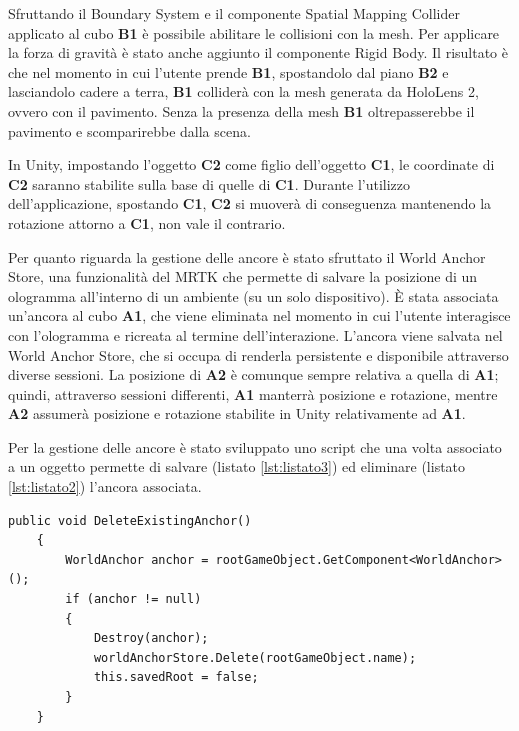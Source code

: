 Sfruttando il Boundary System e il componente Spatial Mapping Collider applicato al cubo \textbf{B1} è possibile abilitare le collisioni con la mesh. Per applicare la forza di gravità è stato anche aggiunto il componente Rigid Body.
Il risultato è che nel momento in cui l'utente prende \textbf{B1}, spostandolo dal piano \textbf{B2} e lasciandolo cadere a terra, \textbf{B1} colliderà con la mesh generata da HoloLens 2, ovvero con il pavimento.
Senza la presenza della mesh \textbf{B1} oltrepasserebbe il pavimento e scomparirebbe dalla scena.

In Unity, impostando l'oggetto \textbf{C2} come figlio dell'oggetto \textbf{C1}, le coordinate di \textbf{C2} saranno stabilite sulla base di quelle di \textbf{C1}. Durante l'utilizzo dell'applicazione, spostando \textbf{C1}, \textbf{C2} si muoverà di conseguenza mantenendo la rotazione attorno a \textbf{C1}, non vale il contrario.

Per quanto riguarda la gestione delle ancore è stato sfruttato il World Anchor Store, una funzionalità del MRTK che permette di salvare la posizione di un ologramma all'interno di un ambiente (su un solo dispositivo).
È stata associata un'ancora al cubo \textbf{A1}, che viene eliminata nel momento in cui l'utente interagisce con l'ologramma e ricreata al termine dell'interazione.
L'ancora viene salvata nel World Anchor Store, che si occupa di renderla persistente e disponibile attraverso diverse sessioni.
La posizione di \textbf{A2} è comunque sempre relativa a quella di \textbf{A1}; quindi, attraverso sessioni differenti, \textbf{A1} manterrà posizione e rotazione, mentre \textbf{A2} assumerà posizione e rotazione stabilite in Unity relativamente ad \textbf{A1}. 

Per la gestione delle ancore è stato sviluppato uno script che una volta associato a un oggetto permette di salvare (listato \ref{lst:listato3}) ed eliminare (listato \ref{lst:listato2}) l'ancora associata.

\lstset{language=[Sharp]C, numbers=left}
\begin{lstlisting}[caption={Metodo richiamato per eliminare l'ancora dell'ologramma associato.}, label=lst:listato2]
    public void DeleteExistingAnchor()
    {
        WorldAnchor anchor = rootGameObject.GetComponent<WorldAnchor>();
        if (anchor != null)
        {
            Destroy(anchor);
            worldAnchorStore.Delete(rootGameObject.name);
            this.savedRoot = false;
        }
    }
\end{lstlisting}

